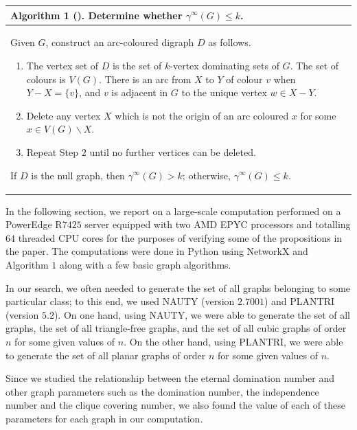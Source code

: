 \documentclass[11pt]{article}
\begin{document}
	\begin{table}[h]
		\begin{center}
			\begin{tabular}{p{15cm}}
				\hline
				\textbf{Algorithm 1} (\cite{klostermeyer2016dynamic})\textbf{.} Determine whether $\gamma^\infty(G) \leq k$. \\
				\hline
				Given $G$, construct an arc-coloured digraph $D$ as follows.
				\begin{enumerate}
					\item The vertex set of $D$ is the set of $k$-vertex dominating sets of $G$. The set of colours is $V(G)$. There is an arc from $X$ to $Y$ of colour $v$ when $Y-X=\{v\}$, and $v$ is adjacent in $G$ to the unique vertex $w \in X-Y$.
					\item Delete any vertex $X$ which is not the origin of an arc coloured $x$ for some $x \in V(G) \backslash X$.
					\item Repeat Step $2$ until no further vertices can be deleted.
				\end{enumerate}
				If $D$ is the null graph, then $\gamma^\infty(G) > k$; otherwise, $\gamma^\infty(G) \leq k$. \\
				\hline
			\end{tabular}
		\end{center}
	\end{table}

	\vspace{-12pt}
	In the following section, we report on a large-scale computation performed on a PowerEdge R$7425$ server equipped with two AMD EPYC processors and totalling $64$ threaded CPU cores for the purposes of verifying some of the propositions in the paper. The computations were done in Python using NetworkX and Algorithm $1$ along with a few basic graph algorithms. 

	In our search, we often needed to generate the set of all graphs belonging to some particular class; to this end, we used NAUTY \cite{mckay2014practical} (version $2.7001$) and PLANTRI \cite{brinkmann2007fast, brinkmann2007plantri} (version $5.2$). On one hand, using NAUTY, we were able to generate the set of all graphs, the set of all triangle-free graphs, and the set of all cubic graphs of order $n$ for some given values of $n$. On the other hand, using PLANTRI, we were able to generate the set of all planar graphs of order $n$ for some given values of $n$.
	
	Since we studied the relationship between the eternal domination number and other graph parameters such as the domination number, the independence number and the clique covering number, we also found the value of each of these parameters for each graph in our computation. 
	
\end{document}
